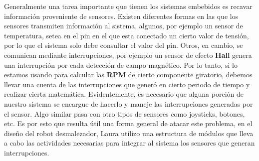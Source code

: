 Generalmente una tarea importante que tienen los sistemas embebidos es recavar información proveniente de sensores. Existen diferentes formas en las que los sensores transmiten información al sistema, algunos, por ejemplo un sensor de temperatura, setea en el pin en el que esta conectado un cierto valor de tensión, por lo que el sistema solo debe consultar el valor del pin. Otros, en cambio, se comunican mediante interrupciones, por ejemplo un sensor de efecto \textbf{Hall} genera una interrupción por cada detección de campo magnético. Por lo tanto, si lo estamos usando para calcular las \textbf{RPM} de cierto componente giratorio, debemos llevar una cuenta de las interrupciones que generó en cierto periodo de tiempo y realizar cierta matemática. Evidentemente, es necesario que alguna porción de nuestro sistema se encargue de hacerlo y maneje las interrupciones generadas por el sensor. Algo similar pasa con otro tipos de sensores como joysticks, botones, etc. Es por esto que resulta útil una forma general de atacar este problema, en el diseño del robot desmalezador, Laura utilizo una estructura de módulos que lleva a cabo las actividades necesarias para integrar al sistema los sensores que generan interrupciones.

